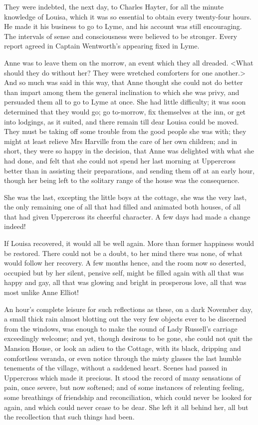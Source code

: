 They were indebted, the next day, to Charles Hayter, for all the minute knowledge of Louisa, which it was so essential to obtain every twenty-four hours. He made it his business to go to Lyme, and his account was still encouraging. The intervals of sense and consciousness were believed to be stronger. Every report agreed in Captain Wentworth's appearing fixed in Lyme.

Anne was to leave them on the morrow, an event which they all dreaded. <What should they do without her? They were wretched comforters for one another.> And so much was said in this way, that Anne thought she could not do better than impart among them the general inclination to which she was privy, and persuaded them all to go to Lyme at once. She had little difficulty; it was soon determined that they would go; go to-morrow, fix themselves at the inn, or get into lodgings, as it suited, and there remain till dear Louisa could be moved. They must be taking off some trouble from the good people she was with; they might at least relieve Mrs Harville from the care of her own children; and in short, they were so happy in the decision, that Anne was delighted with what she had done, and felt that she could not spend her last morning at Uppercross better than in assisting their preparations, and sending them off at an early hour, though her being left to the solitary range of the house was the consequence.

She was the last, excepting the little boys at the cottage, she was the very last, the only remaining one of all that had filled and animated both houses, of all that had given Uppercross its cheerful character. A few days had made a change indeed!

If Louisa recovered, it would all be well again. More than former happiness would be restored. There could not be a doubt, to her mind there was none, of what would follow her recovery. A few months hence, and the room now so deserted, occupied but by her silent, pensive self, might be filled again with all that was happy and gay, all that was glowing and bright in prosperous love, all that was most unlike Anne Elliot!

An hour's complete leisure for such reflections as these, on a dark November day, a small thick rain almost blotting out the very few objects ever to be discerned from the windows, was enough to make the sound of Lady Russell's carriage exceedingly welcome; and yet, though desirous to be gone, she could not quit the Mansion House, or look an adieu to the Cottage, with its black, dripping and comfortless veranda, or even notice through the misty glasses the last humble tenements of the village, without a saddened heart. Scenes had passed in Uppercross which made it precious. It stood the record of many sensations of pain, once severe, but now softened; and of some instances of relenting feeling, some breathings of friendship and reconciliation, which could never be looked for again, and which could never cease to be dear. She left it all behind her, all but the recollection that such things had been.

